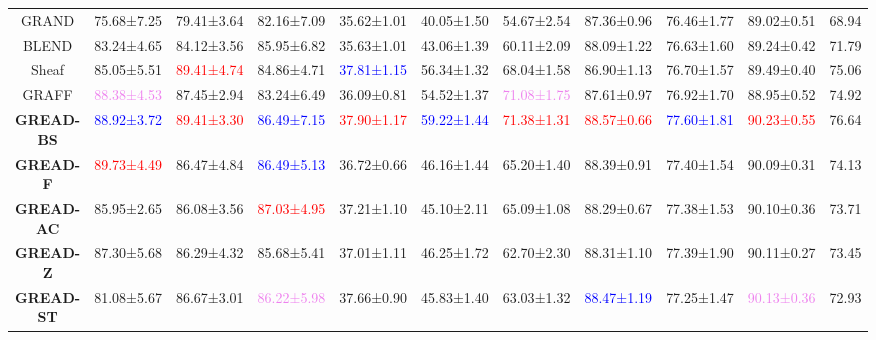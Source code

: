 \documentclass{article}
\theoremstyle{plain}
\theoremstyle{definition}
\theoremstyle{remark}
\newcommand{\std}{\scriptsize{}}
\newcommand{\BEST}[1]{\textcolor{red}{#1}}
\newcommand{\SECOND}[1]{\textcolor{blue}{#1}}
\newcommand{\THIRD}[1]{\textcolor{violet}{#1}}
\begin{document}
\begin{table*}[ht]
\begin{tabular}{c ccccccccc c}
GRAND       & 75.68\std{±7.25} & 79.41\std{±3.64} & 82.16\std{±7.09} & 35.62\std{±1.01} & 40.05\std{±1.50} & 54.67\std{±2.54} & 87.36\std{±0.96} & 76.46\std{±1.77} & 89.02\std{±0.51} & 68.94\\
        BLEND       & 83.24\std{±4.65} & 84.12\std{±3.56} & 85.95\std{±6.82} & 35.63\std{±1.01} & 43.06\std{±1.39} & 60.11\std{±2.09} & 88.09\std{±1.22} & 76.63\std{±1.60} & 89.24\std{±0.42} & 71.79\\
Sheaf       & 85.05\std{±5.51} & \BEST{89.41\std{±4.74}} & 84.86\std{±4.71} & \SECOND{37.81\std{±1.15}} & 56.34\std{±1.32} & 68.04\std{±1.58} & 86.90\std{±1.13} & 76.70±\std{1.57} & 89.49\std{±0.40} & 75.06\\
        GRAFF       & \THIRD{88.38\std{±4.53}} & 87.45\std{±2.94} & 83.24\std{±6.49} & 36.09\std{±0.81} & 54.52\std{±1.37} & \THIRD{71.08\std{±1.75}} & 87.61\std{±0.97} & 76.92±\std{1.70} & 88.95\std{±0.52} & 74.92\\
        \midrule
        \textbf{GREAD-BS}
                    & \SECOND{88.92\std{±3.72}} & \BEST{89.41\std{±3.30}} & \SECOND{86.49\std{±7.15}} 
                    & \BEST{37.90\std{±1.17}} & \SECOND{59.22\std{±1.44}} & \BEST{71.38\std{±1.31}} 
                    & \BEST{88.57\std{±0.66}} & \SECOND{77.60\std{±1.81}} & \BEST{90.23\std{±0.55}} & 76.64\\
        \textbf{GREAD-F} 
                    & \BEST{89.73\std{±4.49}} & 86.47\std{±4.84} & \SECOND{86.49\std{±5.13}}
                    & 36.72\std{±0.66}	& 46.16\std{±1.44} & 65.20\std{±1.40} 
                    & 88.39\std{±0.91} & 77.40\std{±1.54}	& 90.09\std{±0.31} & 74.13\\
        \textbf{GREAD-AC}
                    & 85.95\std{±2.65} & 86.08\std{±3.56} & \BEST{87.03\std{±4.95}} 
                    & 37.21\std{±1.10} & 45.10\std{±2.11} & 65.09\std{±1.08} 
                    & 88.29\std{±0.67} & 77.38\std{±1.53} & 90.10\std{±0.36} & 73.71\\
        \textbf{GREAD-Z} 
                    & 87.30\std{±5.68} & 86.29\std{±4.32} & 85.68\std{±5.41} 
                    & 37.01\std{±1.11} & 46.25\std{±1.72} & 62.70\std{±2.30} 
                    & 88.31\std{±1.10} & 77.39\std{±1.90} & 90.11\std{±0.27} & 73.45\\
        \textbf{GREAD-ST} 
                        & 81.08\std{±5.67} & 86.67\std{±3.01} & \THIRD{86.22\std{±5.98}}
                        & 37.66\std{±0.90} & 45.83\std{±1.40} & 63.03\std{±1.32} 
                        & \SECOND{88.47\std{±1.19}} & 77.25\std{±1.47} & \THIRD{90.13\std{±0.36}} & 72.93\\

\end{tabular}
\end{table*}
\end{document}
